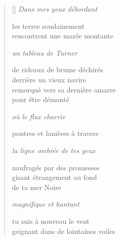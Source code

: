 \documentclass[12pt,a4paper]{article}
\begin{document}
\begin{verse}[\versewidth]
  \emph{Dans mes yeux débordant}

  les terres soudainement \\
  rencontrent une marée montante

  \emph{un tableau de Turner}

  de rideaux de brume déchirés \\
  derrière un vieux navire \\
  remorqué vers sa dernière amarre \\
  pour être démonté

  \emph{où le flux charrie}

  poutres et lanières à travers

  \emph{la ligne ombrée de tes yeux}

  naufragés par des promesses \\
  gisant étrangement au fond \\
  de ta mer Noire

  \emph{magnifique et hantant}

  tu suis à nouveau le vent \\
  geignant dans de lointaines voiles
\end{verse}


\newpage

\poemtitle{}

\settowidth{\versewidth}{Vous ne pouvez que ressentir et je vois}

\bigskip
\end{document}

